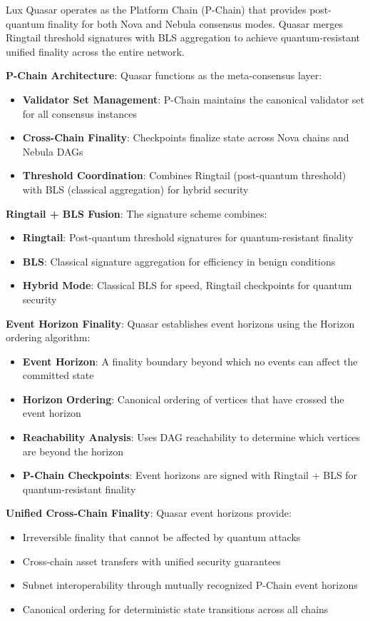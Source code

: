Lux Quasar operates as the Platform Chain (P-Chain) that provides post-quantum finality for both Nova and Nebula consensus modes. Quasar merges Ringtail threshold signatures with BLS aggregation to achieve quantum-resistant unified finality across the entire network.

\textbf{P-Chain Architecture}: Quasar functions as the meta-consensus layer:
\begin{itemize}
\item \textbf{Validator Set Management}: P-Chain maintains the canonical validator set for all consensus instances
\item \textbf{Cross-Chain Finality}: Checkpoints finalize state across Nova chains and Nebula DAGs
\item \textbf{Threshold Coordination}: Combines Ringtail (post-quantum threshold) with BLS (classical aggregation) for hybrid security
\end{itemize}

\textbf{Ringtail + BLS Fusion}: The signature scheme combines:
\begin{itemize}
\item \textbf{Ringtail}: Post-quantum threshold signatures for quantum-resistant finality
\item \textbf{BLS}: Classical signature aggregation for efficiency in benign conditions
\item \textbf{Hybrid Mode}: Classical BLS for speed, Ringtail checkpoints for quantum security
\end{itemize}

\textbf{Event Horizon Finality}: Quasar establishes event horizons using the Horizon ordering algorithm:
\begin{itemize}
\item \textbf{Event Horizon}: A finality boundary beyond which no events can affect the committed state
\item \textbf{Horizon Ordering}: Canonical ordering of vertices that have crossed the event horizon
\item \textbf{Reachability Analysis}: Uses DAG reachability to determine which vertices are beyond the horizon
\item \textbf{P-Chain Checkpoints}: Event horizons are signed with Ringtail + BLS for quantum-resistant finality
\end{itemize}

\textbf{Unified Cross-Chain Finality}: Quasar event horizons provide:
\begin{itemize}
\item Irreversible finality that cannot be affected by quantum attacks
\item Cross-chain asset transfers with unified security guarantees  
\item Subnet interoperability through mutually recognized P-Chain event horizons
\item Canonical ordering for deterministic state transitions across all chains
\end{itemize}

